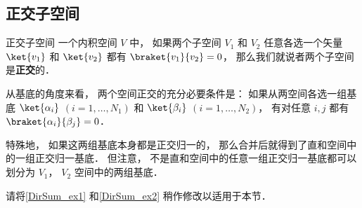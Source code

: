 
\subsection{正交子空间}

\begin{definition}{正交子空间}
一个内积空间 $V$ 中， 如果两个子空间 $V_1$ 和 $V_2$ 任意各选一个矢量 $\ket{v_1}$ 和 $\ket{v_2}$ 都有 $\braket{v_1}{v_2} = 0$， 那么我们就说者两个子空间是\textbf{正交}的．
\end{definition}

\begin{theorem}{}
从基底的角度来看， 两个空间正交的充分必要条件是： 如果从两空间各选一组基底 $\ket{\alpha_i}$ $(i = 1, \dots, N_1)$ 和 $\ket{\beta_i}$ $(i = 1, \dots, N_2)$， 有对任意 $i, j$ 都有 $\braket{\alpha_i}{\beta_j} = 0$．
\end{theorem}

特殊地， 如果这两组基底本身都是正交归一的， 那么合并后就得到了直和空间中的一组正交归一基底． 但注意， 不是直和空间中的任意一组正交归一基底都可以划分为 $V_1$， $V_2$ 空间中的两组基底．

\begin{exercise}{}
请将\autoref{DirSum_ex1} 和\autoref{DirSum_ex2} 稍作修改以适用于本节．
\end{exercise}
